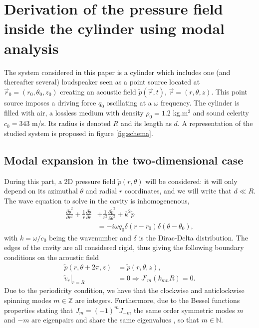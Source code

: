 \documentclass[%
 reprint,
 amsmath,amssymb,
 aip,
]{revtex4-1}
\begin{document}
\section{Derivation of the pressure field inside the cylinder using modal analysis}
The system considered in this paper is a cylinder which includes one (and thereafter several) loudspeaker seen as a point source located at $\vec{r}_0 = (r_0, \theta_0, z_0)$ creating an acoustic field $\tilde{p}(\vec{r}, t)$, $\vec{r} = (r, \theta, z)$. This point source imposes a driving force $q_0$ oscillating at a $\omega$ frequency. The cylinder is filled with air, a lossless medium with density $\rho_0 = 1.2$ kg.m$^3$ and sound celerity $c_0 = 343$ m/s. Its radius is denoted $R$ and its length as $d$. A representation of the studied system is proposed in figure \ref{fig:schema}.

\subsection{Modal expansion in the two-dimensional case}
During this part, a 2D pressure field $\tilde{p}(r, \theta)$ will be considered: it will only depend on its azimuthal $\theta$ and radial $r$ coordinates, and we will write that $d \ll R$. The wave equation to solve in the cavity is inhomogenenous,
\begin{equation}
    \begin{split}
        \frac{\partial \tilde{p}^2}{\partial r^2} + \frac{1}{r} \frac{\partial \tilde{p}}{\partial r} &+ \frac{1}{r^2} \frac{\partial \tilde{p}^2}{\partial \theta^2} + k^2 \tilde{p}\\ &= -i \omega q_0 \delta(r - r_0) \delta(\theta - \theta_0),
    \end{split} \label{eq:2dwaveq}
\end{equation}
with $k = \omega/c_0$ being the wavenumber and $\delta$ is the Dirac-Delta distribution.
The edges of the cavity are all considered rigid, thus giving the following boundary conditions on the acoustic field
\begin{equation}
   \begin{split}
       \tilde{p}(r, \theta + 2 \pi , z) &= \tilde{p}(r, \theta, z),\\
               \left. \tilde{v}_r \right|_{r=R} & = 0 \Rightarrow J'_m (k_{mn}R) = 0.
   \end{split} \label{eq:bc2d}
\end{equation}
Due to the periodicity condition, we have that the clockwise and anticlockwise spinning modes $m \in \mathbb{Z}$ are integers. Furthermore, due to the Bessel functions properties stating that $J_m = (-1)^m J_{-m}$ the same order symmetric modes $m$ and $-m$ are eigenpairs and share the same eigenvalues \cite{rona2007}, so that $m \in \mathbb{N}$.
\end{document}

